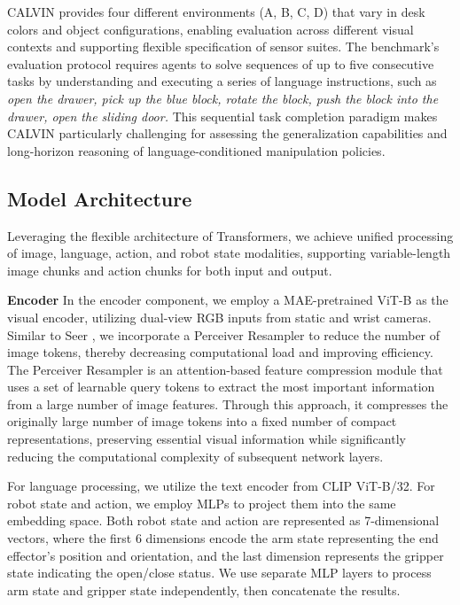 CALVIN provides four different environments (A, B, C, D) that vary in desk colors and object configurations, enabling evaluation across different visual contexts and supporting flexible specification of sensor suites. The benchmark's evaluation protocol requires agents to solve sequences of up to five consecutive tasks by understanding and executing a series of language instructions, such as \textit{open the drawer, pick up the blue block, rotate the block, push the block into the drawer, open the sliding door.} This sequential task completion paradigm makes CALVIN particularly challenging for assessing the generalization capabilities and long-horizon reasoning of language-conditioned manipulation policies.




\subsection{Model Architecture}

Leveraging the flexible architecture of Transformers, we achieve unified processing of image, language, action, and robot state modalities, supporting variable-length image chunks and action chunks for both input and output.

\textbf{Encoder} In the encoder component, we employ a MAE-pretrained ViT-B \citep{he2022masked} as the visual encoder, utilizing dual-view RGB inputs from static and wrist cameras. Similar to Seer \citep{tian2024predictiveinversedynamicsmodels}, we incorporate a Perceiver Resampler \citep{jaegle2021perceiver}  to reduce the number of image tokens, thereby decreasing computational load and improving efficiency. The Perceiver Resampler is an attention-based feature compression module that uses a set of learnable query tokens to extract the most important information from a large number of image features. Through this approach, it compresses the originally large number of image tokens into a fixed number of compact representations, preserving essential visual information while significantly reducing the computational complexity of subsequent network layers.

For language processing, we utilize the text encoder from CLIP ViT-B/32. For robot state and action, we employ MLPs to project them into the same embedding space. Both robot state and action are represented as 7-dimensional vectors, where the first 6 dimensions encode the arm state representing the end effector's position and orientation, and the last dimension represents the gripper state indicating the open/close status. We use separate MLP layers to process arm state and gripper state independently, then concatenate the results.

